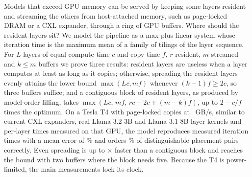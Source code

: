 Models that exceed GPU memory can be served by keeping some layers resident and streaming the others from host-attached memory, such as page-locked DRAM or a CXL expander, through a ring of GPU buffers. Where should the resident layers sit? We model the pipeline as a max-plus linear system whose iteration time is the maximum mean of a family of tilings of the layer sequence. For $L$ layers of equal compute time $c$ and copy time $f$, $r$ resident, $m$ streamed and $k\le m$ buffers we prove three results: resident layers are useless when a layer computes at least as long as it copies; otherwise, spreading the resident layers evenly attains the lower bound $\max(Lc,mf)$ whenever $(k-1)f\ge 2c$, so three buffers suffice; and a contiguous block of resident layers, as produced by model-order filling, takes $\max(Lc,\,mf,\,rc+2c+(m-k)f)$, up to $2-c/f$ times the optimum. On a Tesla T4 with page-locked copies at \nHwBw~GB/s, similar to current CXL expanders, real Llama-3.2-3B and Llama-3.1-8B layer kernels and per-layer times measured on that GPU, the model reproduces \nAccN{} measured iteration times with a mean error of \nAccMape\% and orders \nAccRankExact\% of distinguishable placement pairs correctly. Even spreading is up to \nMeasPenaltyMax$\times$ faster than a contiguous block and reaches the bound with two buffers where the block needs five. Because the T4 is power-limited, the main measurements lock its clock.

